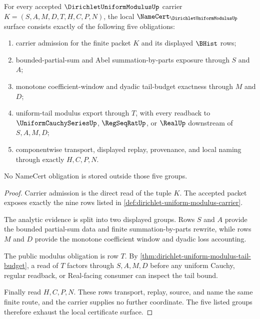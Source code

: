 \begin{theorem}
\label{thm:dirichlet-uniform-modulus-namecert-obligations}
For every accepted $\DirichletUniformModulusUp$ carrier $K=(S,A,M,D,T,H,C,P,N)$, the local $\NameCert_{\DirichletUniformModulusUp}$ surface consists exactly of the following five obligations:
\begin{enumerate}
\item carrier admission for the finite packet $K$ and its displayed $\BHist$ rows;
\item bounded-partial-sum and Abel summation-by-parts exposure through $S$ and $A$;
\item monotone coefficient-window and dyadic tail-budget exactness through $M$ and $D$;
\item uniform-tail modulus export through $T$, with every readback to $\UniformCauchySeriesUp$, $\RegSeqRatUp$, or $\RealUp$ downstream of $S,A,M,D$;
\item componentwise transport, displayed replay, provenance, and local naming through exactly $H,C,P,N$.
\end{enumerate}
No NameCert obligation is stored outside those five groups.
\end{theorem}
\begin{proof}
Carrier admission is the direct read of the tuple $K$. The accepted packet exposes exactly the nine rows listed in \autoref{def:dirichlet-uniform-modulus-carrier}.

The analytic evidence is split into two displayed groups. Rows $S$ and $A$ provide the bounded partial-sum data and finite summation-by-parts rewrite, while rows $M$ and $D$ provide the monotone coefficient window and dyadic loss accounting.

The public modulus obligation is row $T$. By \autoref{thm:dirichlet-uniform-modulus-tail-budget}, a read of $T$ factors through $S,A,M,D$ before any uniform Cauchy, regular readback, or Real-facing consumer can inspect the tail bound.

Finally read $H,C,P,N$. These rows transport, replay, source, and name the same finite route, and the carrier supplies no further coordinate. The five listed groups therefore exhaust the local certificate surface.
\end{proof}


